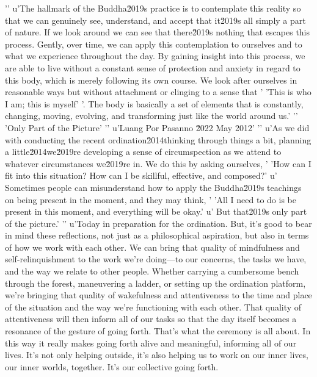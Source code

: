 '\n'
u'The hallmark of the Buddha\u2019s practice is to contemplate this reality so that we can genuinely see, understand, and accept that it\u2019s all simply a part of nature. If we look around we can see that there\u2019s nothing that escapes this process. Gently, over time, we can apply this contemplation to ourselves and to what we experience throughout the day. By gaining insight into this process, we are able to live without a constant sense of protection and anxiety in regard to this body, which is merely following its own course. We look after ourselves in reasonable ways but without attachment or clinging to a sense that '
'This is who I am; this is myself'
'. The body is basically a set of elements that is constantly, changing, moving, evolving, and transforming just like the world around us.'
'\n'
'Only Part of the Picture'
'\n'
u'Luang Por Pasanno \u2022 May 2012'
'\n'
u'As we did with conducting the recent ordination\u2014thinking through things a bit, planning a little\u2014we\u2019re developing a sense of circumspection as we attend to whatever circumstances we\u2019re in. We do this by asking ourselves, '
'How can I fit into this situation? How can I be skillful, effective, and composed?'
u' Sometimes people can misunderstand how to apply the Buddha\u2019s teachings on being present in the moment, and they may think, '
'All I need to do is be present in this moment, and everything will be okay.'
u' But that\u2019s only part of the picture.'
'\n'
u'Today in 
preparation for the ordination. But, it's good to bear in mind these 
reflections, not just as a philosophical aspiration, but also in terms 
of how we work with each other. We can bring that quality of 
mindfulness and self-relinquishment to the work we're doing---to our 
concerns, the tasks we have, and the way we relate to other people. 
Whether carrying a cumbersome bench through the forest, maneuvering a 
ladder, or setting up the ordination platform, we're bringing that 
quality of wakefulness and attentiveness to the time and place of the 
situation and the way we're functioning with each other. That quality 
of attentiveness will then inform all of our tasks so that the day 
itself becomes a resonance of the gesture of going forth. That's what 
the ceremony is all about. In this way it really makes going forth 
alive and meaningful, informing all of our lives. It's not only helping 
outside, it's also helping us to work on our inner lives, our inner 
worlds, together. It's our collective going forth.


